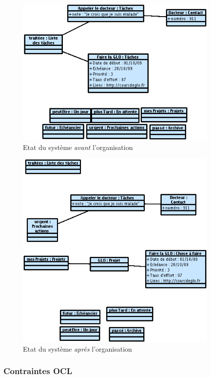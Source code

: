 \begin{figure}[!ht]
\begin{center}
\includegraphics[width=10cm]{images/Instantane_Organize_1.png}
\caption{Etat du système \emph{avant} l'organisation}
\label{organize1}
\end{center}
\end{figure}

\begin{figure}[!ht]
\begin{center}
\includegraphics[width=10cm]{images/Instantane_Organize_2.png}
\caption{Etat du système \emph{après} l'organisation}
\label{organize2}
\end{center}
\end{figure}

\subsubsection{Contraintes OCL}

